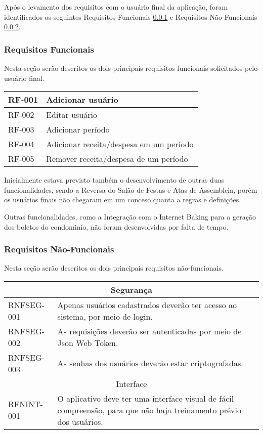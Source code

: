 \documentclass[12pt]{article}
\begin{document}
Após o levamento dos requisitos com o usuário final da aplicação, foram identificados os seguintes Requisitos Funcionais \ref{Req-func} e Requisitos Não-Funcionais \ref{Req-nfunc}.

\subsubsection{Requisitos Funcionais}
\label{Req-func}
Nesta seção serão descritos os dois principais requisitos funcionais solicitados pelo usuário final.

\begin{center}
\begin{tabular}{| p{} | p{} |}
  \hline
  RF-001 & Adicionar usuário \\
  \hline
  RF-002 & Editar usuário \\
  \hline
  RF-003 & Adicionar período \\
  \hline
  RF-004 & Adicionar receita/despesa em um período \\
  \hline
  RF-005 & Remover receita/despesa de um período \\
  \hline  
\end{tabular}
\end{center}

Inicialmente estava previsto também o desenvolvimento de outras duas funcionalidades, sendo a Reversa do Salão de Festas e Atas de Assembleia, porém os usuários finais não chegaram em um conceso quanta a regras e definições. 

Outras funcionalidades, como a Integração com o Internet Baking para a geração dos boletos do condominío, não foram desenvolvidas por falta de tempo.

\subsubsection{Requisitos Não-Funcionais}
\label{Req-nfunc}
Nesta seção serão descritos os dois principais requisitos não-funcionais.

\begin{center}
\begin{tabular}{| p{} | p{} |}
  \hline
  \multicolumn{2}{|c|}{\cellcolor{gray!30}Segurança} \\
  \hline
  RNFSEG-001 & Apenas usuários cadastrados deverão ter acesso ao sistema, 
  por meio de login. \\
  \hline
  RNFSEG-002 & As requisições deverão ser autenticadas por meio de Json Web Token. \\
  \hline
  RNFSEG-003 & As senhas dos usuários deverão estar criptografadas. \\
  \hline
  \multicolumn{2}{|c|}{\cellcolor{gray!30}Interface} \\
  \hline
  RFNINT-001 & O aplicativo deve ter uma interface visual de fácil compreensão, para que não haja treinamento prévio dos usuários. \\
  \hline
\end{tabular}
\end{center}
\end{document}
